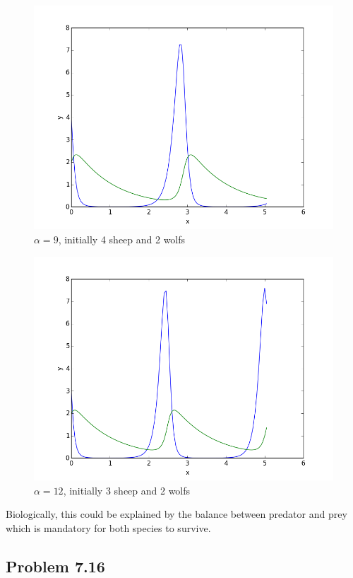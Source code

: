 \begin{figure}[!ht]
\includegraphics[width=1\textwidth]{chapters/images/figure-7-15-2}
\caption{$\alpha = 9$, initially 4 sheep and 2 wolfs}
\end{figure}


\begin{figure}[!ht]
\includegraphics[width=1\textwidth]{chapters/images/figure-7-15-3}
\caption{$\alpha = 12$, initially 3 sheep and 2 wolfs}
\end{figure}

Biologically, this could be explained by the balance between predator and prey which is mandatory for both species to survive.

\subsection{Problem 7.16}


